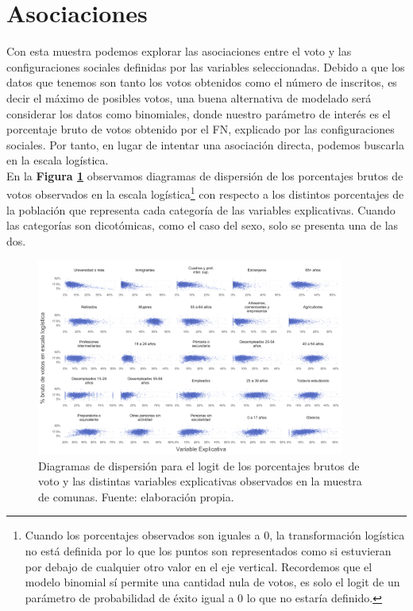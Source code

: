 \section{Asociaciones}

Con esta muestra podemos explorar las asociaciones entre el voto y las configuraciones sociales definidas por las variables seleccionadas. Debido a que los datos que tenemos son tanto los votos obtenidos como el número de inscritos, es decir el máximo de posibles votos, una buena alternativa de modelado será considerar los datos como binomiales, donde nuestro parámetro de interés es el porcentaje bruto de votos obtenido por el FN, explicado por las configuraciones sociales. Por tanto, en lugar de intentar una asociación directa, podemos buscarla en la escala logística.\\

En la \textbf{Figura \ref{fig:Disper_Voto_Variables}} observamos diagramas de dispersión de los porcentajes brutos de votos observados en la escala logística\footnote{Cuando los porcentajes observados son iguales a 0, la transformación logística no está definida por lo que los puntos son representados como si estuvieran por debajo de cualquier otro valor en el eje vertical. Recordemos que el modelo binomial sí permite una cantidad nula de votos, es solo el logit de un parámetro de probabilidad de éxito igual a 0 lo que no estaría definido.} con respecto a los distintos porcentajes de la población que representa cada categoría de las variables explicativas. Cuando las categorías son dicotómicas, como el caso del sexo, solo se presenta una de las dos.\\ 

\begin{figure}
	\centering
	\includegraphics[width = 0.9\textwidth]{Figs/AED/Asociaciones_MUESTRA}
	\caption{Diagramas de dispersión para el logit de los porcentajes brutos de voto y las distintas variables explicativas observados en la muestra de comunas. Fuente: elaboración propia.}
	\label{fig:Disper_Voto_Variables}	
\end{figure}

